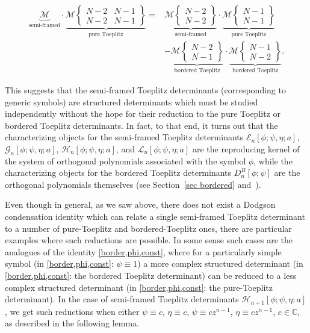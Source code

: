 \documentclass[10pt,a4paper]{amsart}
\numberwithin{equation}{section}
\newcommand{\C}{{\mathbb C}}
\begin{document}
		\begin{align*}%
 \underbrace{\mathscr{M}}_{\text{semi-framed}}
\cdot \underbrace{ \mathscr{M}\left\lbrace \begin{matrix} N-2 & N-1 \\ N-2 & N-1 \end{matrix} \right\rbrace }_{\text{pure Toeplitz}} ={}& \underbrace{ \mathscr{M}\left\lbrace \begin{matrix} N-2 \\ N-2 \end{matrix} \right\rbrace }_{\text{semi-framed}} \cdot \underbrace{ \mathscr{M}\left\lbrace \begin{matrix} N-1 \\ N-1 \end{matrix} \right\rbrace}_{\text{pure Toeplitz}} \\ &- \underbrace{ \mathscr{M}\left\lbrace \begin{matrix} N-2 \\ N-1 \end{matrix} \right\rbrace}_{\text{bordered Toeplitz}} \cdot \underbrace{ \mathscr{M}\left\lbrace \begin{matrix} N-1 \\ N-2 \end{matrix} \right\rbrace}_{\text{bordered Toeplitz}}.
		\end{align*}
		
		This suggests that the semi-framed Toeplitz determinants (corresponding to generic symbols) are structured determinants which must be studied independently without the hope for their reduction to the pure Toeplitz or bordered Toeplitz determinants. In fact, to that end, it turns out that the characterizing objects for the semi-framed Toeplitz determinants $\mathscr{E}_n[\phi;\psi,\eta;a]$, $\mathscr{G}_n[\phi;\psi,\eta;a]$, $\mathscr{H}_n[\phi;\psi,\eta;a]$, and $\mathscr{L}_n[\phi;\psi,\eta;a]$ are the reproducing kernel of the system of orthogonal polynomials associated with the symbol $\phi$, while the characterizing objects for the bordered Toeplitz determinants $D^B_n[\phi;\psi]$ are the orthogonal polynomials themselves (see Section~\ref{sec bordered} and~\cite{BEGIL}).
		
		Even though in general, as we saw above, there does not exist a Dodgson condensation identity which can relate a single semi-framed Toeplitz determinant to a number of pure-Toeplitz and bordered-Toeplitz ones, there are particular examples where such reductions are possible. In some sense such cases are the analogues of the identity \eqref{border,phi,const}, where for a particularly simple symbol (in \eqref{border,phi,const}: $\psi \equiv 1$) a more complex structured determinant (in \eqref{border,phi,const}: the bordered Toeplitz determinant) can be reduced to a less complex structured determinant (in \eqref{border,phi,const}: the pure-Toeplitz determinant). In the case of semi-framed Toeplitz determinants $\mathscr{H}_{n+1}[\phi;\psi,\eta;a]$, we get such reductions when either $\psi \equiv c$, $\eta \equiv c$, $\psi \equiv cz^{n-1}$, $\eta \equiv cz^{n-1}$, $c \in \C$, as described in the following lemma.
		
\end{document}
